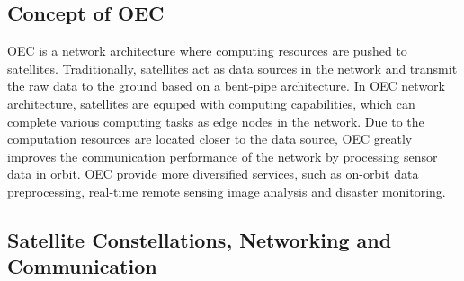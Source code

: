 \documentclass[lettersize,journal]{IEEEtran}
\begin{document}
\subsection{Concept of OEC}
OEC is a network architecture where computing resources are pushed to satellites. Traditionally, satellites act as data sources in the network and transmit the raw data to the ground based on a bent-pipe architecture. In OEC network architecture, satellites are equiped with computing capabilities, which can complete various computing tasks as edge nodes in the network. Due to the computation resources are located closer to the data source, OEC greatly improves the communication performance of the network by processing sensor data in orbit. OEC provide more diversified services, such as on-orbit data preprocessing, real-time remote sensing image analysis and disaster monitoring. 

\subsection{Satellite Constellations, Networking and Communication}
\end{document}
